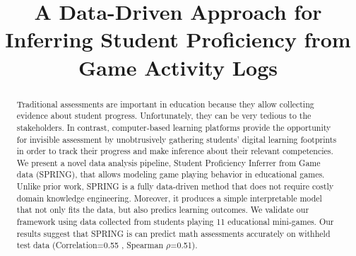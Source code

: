 \documentclass{sigchi}
\def\algname{SPRING\xspace}
\def\plaintitle{A Data-Driven Approach for Inferring Student Proficiency from Game Activity Logs  }
\begin{document}
	

\title{\plaintitle}

\author
{%
}


  
\maketitle

\begin{abstract}
Traditional assessments are important in education because they allow collecting evidence about student progress. 
Unfortunately, they can be very tedious to the stakeholders.
In contrast, computer-based learning platforms provide the opportunity for invisible assessment by unobtrusively gathering students' digital learning footprints in order to track their progress and make inference about their relevant competencies.
We present a novel data analysis pipeline, {Student Proficiency Inferrer from Game data} (\algname), that allows modeling  game playing behavior in educational games.
Unlike prior work, \algname is a fully data-driven method that does not require costly domain knowledge engineering.
Moreover, it produces a simple interpretable model that not only fits the data, but also predics learning outcomes.
We validate our framework using data collected from students playing 11 educational mini-games.
Our results suggest that \algname is can predict math assessments accurately on withheld test data (Correlation=0.55 , Spearman $\rho$=0.51).
\end{abstract}
\end{document}
